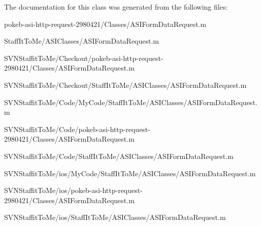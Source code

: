 \-The documentation for this class was generated from the following files\-:\begin{DoxyCompactItemize}
\item 
pokeb-\/asi-\/http-\/request-\/2980421/\-Classes/\-A\-S\-I\-Form\-Data\-Request.\-m\item 
\-Staff\-It\-To\-Me/\-A\-S\-I\-Classes/\-A\-S\-I\-Form\-Data\-Request.\-m\item 
\-S\-V\-N\-Staffit\-To\-Me/\-Checkout/pokeb-\/asi-\/http-\/request-\/2980421/\-Classes/\-A\-S\-I\-Form\-Data\-Request.\-m\item 
\-S\-V\-N\-Staffit\-To\-Me/\-Checkout/\-Staff\-It\-To\-Me/\-A\-S\-I\-Classes/\-A\-S\-I\-Form\-Data\-Request.\-m\item 
\-S\-V\-N\-Staffit\-To\-Me/\-Code/\-My\-Code/\-Staff\-It\-To\-Me/\-A\-S\-I\-Classes/\-A\-S\-I\-Form\-Data\-Request.\-m\item 
\-S\-V\-N\-Staffit\-To\-Me/\-Code/pokeb-\/asi-\/http-\/request-\/2980421/\-Classes/\-A\-S\-I\-Form\-Data\-Request.\-m\item 
\-S\-V\-N\-Staffit\-To\-Me/\-Code/\-Staff\-It\-To\-Me/\-A\-S\-I\-Classes/\-A\-S\-I\-Form\-Data\-Request.\-m\item 
\-S\-V\-N\-Staffit\-To\-Me/ios/\-My\-Code/\-Staff\-It\-To\-Me/\-A\-S\-I\-Classes/\-A\-S\-I\-Form\-Data\-Request.\-m\item 
\-S\-V\-N\-Staffit\-To\-Me/ios/pokeb-\/asi-\/http-\/request-\/2980421/\-Classes/\-A\-S\-I\-Form\-Data\-Request.\-m\item 
\-S\-V\-N\-Staffit\-To\-Me/ios/\-Staff\-It\-To\-Me/\-A\-S\-I\-Classes/\-A\-S\-I\-Form\-Data\-Request.\-m\end{DoxyCompactItemize}
